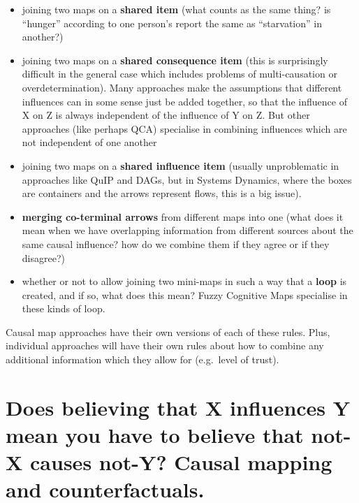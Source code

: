 \documentclass[
]{book}
\providecommand{\tightlist}{%
  \setlength{\itemsep}{0pt}\setlength{\parskip}{0pt}}
\begin{document}
\begin{itemize}
\tightlist
\item
  joining two maps on a \textbf{shared item} (what counts as the same thing? is ``hunger'' according to one person's report the same as ``starvation'' in another?)
\item
  joining two maps on a \textbf{shared consequence item} (this is surprisingly difficult in the general case which includes problems of multi-causation or overdetermination). Many approaches make the assumptions that different influences can in some sense just be added together, so that the influence of X on Z is always independent of the influence of Y on Z. But other approaches (like perhaps QCA) specialise in combining influences which are not independent of one another
\item
  joining two maps on a \textbf{shared influence item} (usually unproblematic in approaches like QuIP and DAGs, but in Systems Dynamics, where the boxes are containers and the arrows represent flows, this is a big issue).
\item
  \textbf{merging co-terminal arrows} from different maps into one (what does it mean when we have overlapping information from different sources about the same causal influence? how do we combine them if they agree or if they disagree?)
\item
  whether or not to allow joining two mini-maps in such a way that a \textbf{loop} is created, and if so, what does this mean? Fuzzy Cognitive Maps specialise in these kinds of loop.
\end{itemize}

Causal map approaches have their own versions of each of these rules. Plus, individual approaches will have their own rules about how to combine any additional information which they allow for (e.g.~level of trust).

\hypertarget{does-believing-that-x-influences-y-mean-you-have-to-believe-that-not-x-causes-not-y-causal-mapping-and-counterfactuals.}{%
\section{Does believing that X influences Y mean you have to believe that not-X causes not-Y? Causal mapping and counterfactuals.}\label{does-believing-that-x-influences-y-mean-you-have-to-believe-that-not-x-causes-not-y-causal-mapping-and-counterfactuals.}}
\end{document}
